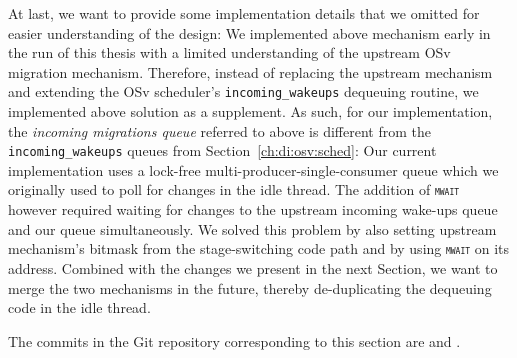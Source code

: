 \documentclass[12pt,a4paper]{book}
\begin{document}
At last, we want to provide some implementation details that we omitted for easier understanding of the design:
We implemented above mechanism early in the run of this thesis with a limited understanding of the upstream OSv migration mechanism.
Therefore, instead of replacing the upstream mechanism and extending the OSv scheduler's \lstinline[style=figurecpp]{incoming_wakeups} dequeuing routine,
we implemented above solution as a supplement.
As such, for our implementation, the \emph{incoming migrations queue} referred to above is different from the \lstinline[style=figurecpp]{incoming_wakeups} queues from Section~\ref{ch:di:osv:sched}:
Our current implementation uses a lock-free multi-producer-single-consumer queue which we originally used to poll for changes in the idle thread.
The addition of \textsc{\texttt{mwait}} however required waiting for changes to the upstream incoming wake-ups queue and our queue simultaneously.
We solved this problem by also setting upstream mechanism's bitmask from the stage-switching code path and by using \textsc{\texttt{mwait}} on its address.
Combined with the changes we present in the next Section, we want to merge the two mechanisms in the future, thereby de-duplicating the dequeuing code in the idle thread.

The commits in the Git repository corresponding to this section are  and .
\end{document}

